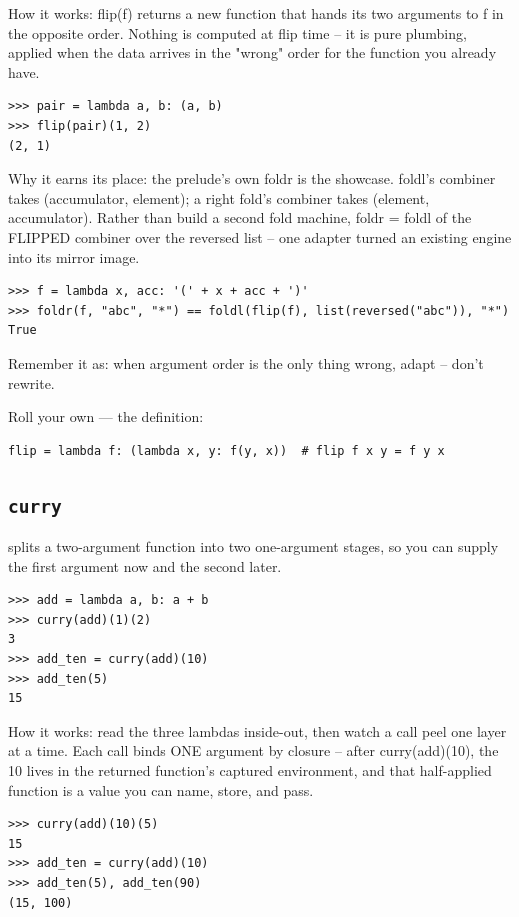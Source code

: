 \documentclass[10pt,letterpaper]{book}
\begin{document}
How it works: flip(f) returns a new function that hands its two arguments to f in the opposite order. Nothing is computed at flip time -- it is pure plumbing, applied when the data arrives in the "wrong" order for the function you already have.

\begin{lstlisting}[style=ex]
>>> pair = lambda a, b: (a, b)
>>> flip(pair)(1, 2)
(2, 1)
\end{lstlisting}

Why it earns its place: the prelude's own foldr is the showcase. foldl's combiner takes (accumulator, element); a right fold's combiner takes (element, accumulator). Rather than build a second fold machine, foldr = foldl of the FLIPPED combiner over the reversed list -- one adapter turned an existing engine into its mirror image.

\begin{lstlisting}[style=ex]
>>> f = lambda x, acc: '(' + x + acc + ')'
>>> foldr(f, "abc", "*") == foldl(flip(f), list(reversed("abc")), "*")
True
\end{lstlisting}

Remember it as: when argument order is the only thing wrong, adapt -- don't rewrite.


Roll your own --- the definition:

\begin{lstlisting}[style=ex]
flip = lambda f: (lambda x, y: f(y, x))  # flip f x y = f y x
\end{lstlisting}
\subsection{\texttt{curry}}\label{def:curry}
splits a two-argument function into two one-argument stages, so you can supply the first argument now and the second later.
\begin{lstlisting}[style=ex]
>>> add = lambda a, b: a + b
>>> curry(add)(1)(2)
3
>>> add_ten = curry(add)(10)
>>> add_ten(5)
15
\end{lstlisting}

How it works: read the three lambdas inside-out, then watch a call peel one layer at a time. Each call binds ONE argument by closure -- after curry(add)(10), the 10 lives in the returned function's captured environment, and that half-applied function is a value you can name, store, and pass.

\begin{lstlisting}[style=ex]
>>> curry(add)(10)(5)
15
>>> add_ten = curry(add)(10)
>>> add_ten(5), add_ten(90)
(15, 100)
\end{lstlisting}
\end{document}
